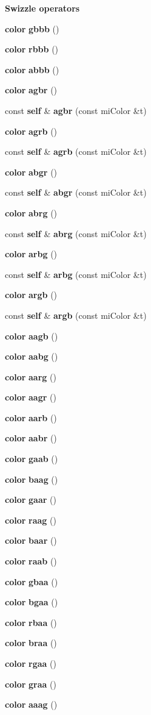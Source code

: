 \begin{Indent}{\bf Swizzle operators}
\begin{CompactItemize}
{\bf color} {\bf gbbb} ()
\item 
{\bf color} {\bf rbbb} ()
\item 
{\bf color} {\bf abbb} ()
\item 
{\bf color} {\bf agbr} ()
\item 
const {\bf self} \& {\bf agbr} (const mi\-Color \&t)
\item 
{\bf color} {\bf agrb} ()
\item 
const {\bf self} \& {\bf agrb} (const mi\-Color \&t)
\item 
{\bf color} {\bf abgr} ()
\item 
const {\bf self} \& {\bf abgr} (const mi\-Color \&t)
\item 
{\bf color} {\bf abrg} ()
\item 
const {\bf self} \& {\bf abrg} (const mi\-Color \&t)
\item 
{\bf color} {\bf arbg} ()
\item 
const {\bf self} \& {\bf arbg} (const mi\-Color \&t)
\item 
{\bf color} {\bf argb} ()
\item 
const {\bf self} \& {\bf argb} (const mi\-Color \&t)
\item 
{\bf color} {\bf aagb} ()
\item 
{\bf color} {\bf aabg} ()
\item 
{\bf color} {\bf aarg} ()
\item 
{\bf color} {\bf aagr} ()
\item 
{\bf color} {\bf aarb} ()
\item 
{\bf color} {\bf aabr} ()
\item 
{\bf color} {\bf gaab} ()
\item 
{\bf color} {\bf baag} ()
\item 
{\bf color} {\bf gaar} ()
\item 
{\bf color} {\bf raag} ()
\item 
{\bf color} {\bf baar} ()
\item 
{\bf color} {\bf raab} ()
\item 
{\bf color} {\bf gbaa} ()
\item 
{\bf color} {\bf bgaa} ()
\item 
{\bf color} {\bf rbaa} ()
\item 
{\bf color} {\bf braa} ()
\item 
{\bf color} {\bf rgaa} ()
\item 
{\bf color} {\bf graa} ()
\item 
{\bf color} {\bf aaag} ()
\item 

\end{CompactItemize}
\end{Indent}
